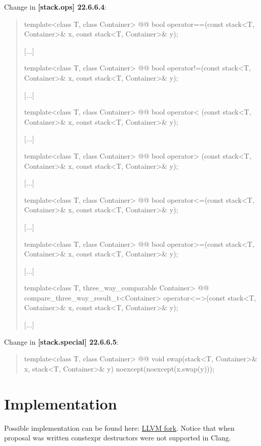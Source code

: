 \documentclass{wg21}
\begin{document}
Change in \textbf{[stack.ops] 22.6.6.4}:
\begin{quote}
\begin{itemdecl}
template<class T, class Container>
  @@ bool operator==(const stack<T, Container>& x, const stack<T, Container>& y);
\end{itemdecl}
[...]
\begin{itemdecl}
template<class T, class Container>
  @@ bool operator!=(const stack<T, Container>& x, const stack<T, Container>& y);	
\end{itemdecl}
[...]
\begin{itemdecl}
template<class T, class Container>
  @@ bool operator< (const stack<T, Container>& x, const stack<T, Container>& y);	
\end{itemdecl}
[...]
\begin{itemdecl}
template<class T, class Container>
  @@ bool operator> (const stack<T, Container>& x, const stack<T, Container>& y);	
\end{itemdecl}
[...]
\begin{itemdecl}
template<class T, class Container>
  @@ bool operator<=(const stack<T, Container>& x, const stack<T, Container>& y);	
\end{itemdecl}
[...]
\begin{itemdecl}
template<class T, class Container>
  @@ bool operator>=(const stack<T, Container>& x, const stack<T, Container>& y);	
\end{itemdecl}
[...]
\begin{itemdecl}
template<class T, three_way_comparable Container>
  @@ compare_three_way_result_t<Container>
    operator<=>(const stack<T, Container>& x, const stack<T, Container>& y);	
\end{itemdecl}
[...]
\end{quote}

Change in \textbf{[stack.special] 22.6.6.5}:
\begin{quote}
\begin{itemdecl}
template<class T, class Container>
  @@ void swap(stack<T, Container>& x, stack<T, Container>& y) 
    noexcept(noexcept(x.swap(y)));	
\end{itemdecl}

\end{quote}

\section{Implementation}
Possible implementation can be found here: \href{https://github.com/ZaMaZaN4iK/llvm-project/tree/feature/stack_constexpr}{LLVM fork}. Notice that when proposal was written constexpr destructors were not supported in Clang.
\end{document}
